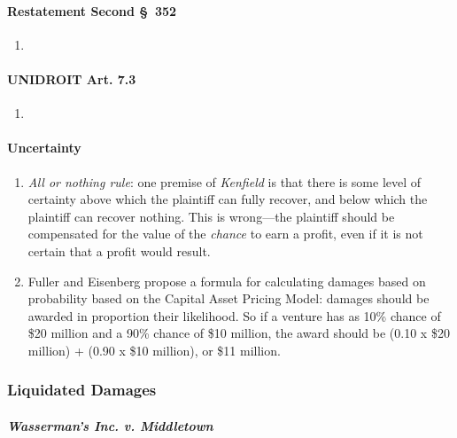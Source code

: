 \paragraph{Restatement Second \S\ 352}

\begin{enumerate}
    \item %
\end{enumerate}

\paragraph{UNIDROIT Art. 7.3}

\begin{enumerate}
    \item %
\end{enumerate}

\paragraph{Uncertainty}

\begin{enumerate}
    \item \emph{All or nothing rule}: one premise of \emph{Kenfield} is that 
    there is some level of certainty above which the plaintiff can fully 
    recover, and below which the plaintiff can recover nothing. This is 
    wrong---the plaintiff should be compensated for the value of the 
    \emph{chance} to earn a profit, even if it is not certain that a profit 
    would result.
    \item Fuller and Eisenberg propose a formula for calculating damages based 
    on probability based on the Capital Asset Pricing Model: damages should be 
    awarded in proportion their likelihood.  So if a venture has as 10\% 
    chance of \$20 million and a 90\% chance of \$10 million, the award should 
    be (0.10 x \$20 million) + (0.90 x \$10 million), or \$11 million.
\end{enumerate}

\subsubsection{Liquidated Damages}

\paragraph{\emph{Wasserman's Inc. v. Middletown}}

